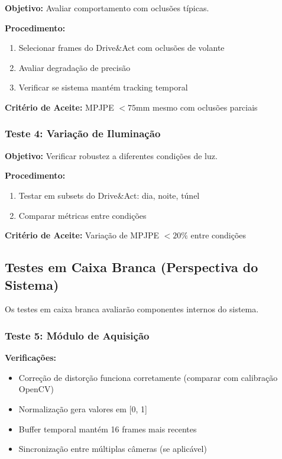 \documentclass[12pt, a4paper]{article}
\begin{document}
\textbf{Objetivo:} Avaliar comportamento com oclusões típicas.

\noindent\textbf{Procedimento:}
\begin{enumerate}
    \item Selecionar frames do Drive\&Act com oclusões de volante
    \item Avaliar degradação de precisão
    \item Verificar se sistema mantém tracking temporal
\end{enumerate}

\noindent\textbf{Critério de Aceite:} MPJPE $< 75$mm mesmo com oclusões parciais

\subsubsection{Teste 4: Variação de Iluminação}

\textbf{Objetivo:} Verificar robustez a diferentes condições de luz.

\noindent\textbf{Procedimento:}
\begin{enumerate}
    \item Testar em subsets do Drive\&Act: dia, noite, túnel
    \item Comparar métricas entre condições
\end{enumerate}

\noindent\textbf{Critério de Aceite:} Variação de MPJPE $< 20\%$ entre condições

\subsection{Testes em Caixa Branca (Perspectiva do Sistema)}

Os testes em caixa branca avaliarão componentes internos do sistema.

\subsubsection{Teste 5: Módulo de Aquisição}

\textbf{Verificações:}
\begin{itemize}
    \item Correção de distorção funciona corretamente (comparar com calibração OpenCV)
    \item Normalização gera valores em [0, 1]
    \item Buffer temporal mantém 16 frames mais recentes
    \item Sincronização entre múltiplas câmeras (se aplicável)
\end{itemize}
\end{document}
